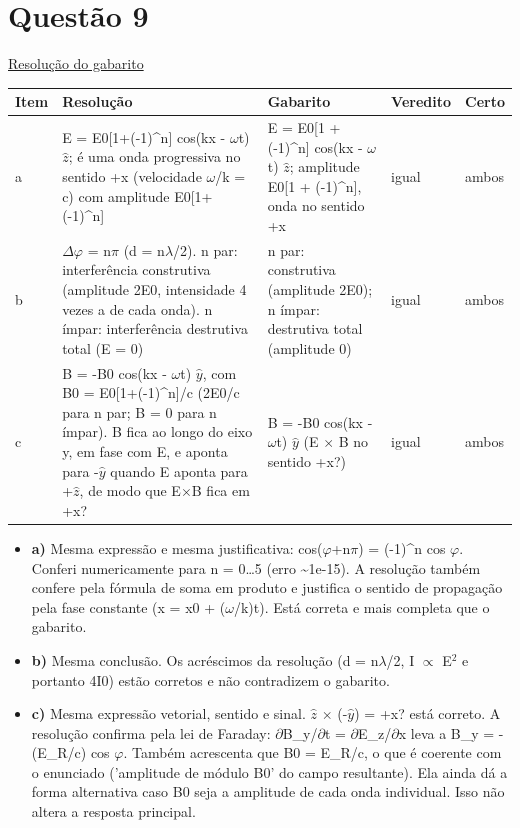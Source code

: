 \documentclass{article}%
\begin{document}
\section*{Questão 9}%
\href{https://poliedroresolve.sistemapoliedro.com.br/vestibulares/ita/2027/ita-2-fase-dia-3-22-10-2026-2-fase-dia-3/dissertativa-9-fisica-2-fase-dia-3-ita-2027}{Resolução do gabarito}\par\smallskip%
\begin{longtable}{@{}p{} p{} p{} p{} p{}@{}}\toprule Item & Resolução & Gabarito & Veredito & Certo \\ \midrule
a & E = E0{[}1+(-1)\^{}n{]} cos(kx - $\omega$t) $\hat z$; é uma onda progressiva no sentido +x (velocidade $\omega$/k = c) com amplitude E0{[}1+(-1)\^{}n{]} & E = E0{[}1 + (-1)\^{}n{]} cos(kx - $\omega$t) $\hat z$; amplitude E0{[}1 + (-1)\^{}n{]}, onda no sentido +x & igual & ambos \\
b & $\Delta$$\varphi$ = n$\pi$ (d = n$\lambda$/2). n par: interferência construtiva (amplitude 2E0, intensidade 4 vezes a de cada onda). n ímpar: interferência destrutiva total (E = 0) & n par: construtiva (amplitude 2E0); n ímpar: destrutiva total (amplitude 0) & igual & ambos \\
c & B = -B0 cos(kx - $\omega$t) $\hat y$, com B0 = E0{[}1+(-1)\^{}n{]}/c (2E0/c para n par; B = 0 para n ímpar). B fica ao longo do eixo y, em fase com E, e aponta para -$\hat y$ quando E aponta para +$\hat z$, de modo que E$\times$B fica em +x? & B = -B0 cos(kx - $\omega$t) $\hat y$ (E $\times$ B no sentido +x?) & igual & ambos \\
\bottomrule\end{longtable}%
\begin{itemize}%
\item%
\textbf{a)} Mesma expressão e mesma justificativa: cos($\varphi$+n$\pi$) = (-1)\^{}n cos $\varphi$. Conferi numericamente para n = 0\ldots{}5 (erro \textasciitilde{}1e{-}15). A resolução também confere pela fórmula de soma em produto e justifica o sentido de propagação pela fase constante (x = x0 + ($\omega$/k)t). Está correta e mais completa que o gabarito.%
\item%
\textbf{b)} Mesma conclusão. Os acréscimos da resolução (d = n$\lambda$/2, I $\propto$ E$^2$ e portanto 4I0) estão corretos e não contradizem o gabarito.%
\item%
\textbf{c)} Mesma expressão vetorial, sentido e sinal. $\hat z$ $\times$ (-$\hat y$) = +x? está correto. A resolução confirma pela lei de Faraday: $\partial$B\_y/$\partial$t = $\partial$E\_z/$\partial$x leva a B\_y = -(E\_R/c) cos $\varphi$. Também acrescenta que B0 = E\_R/c, o que é coerente com o enunciado ('amplitude de módulo B0' do campo resultante). Ela ainda dá a forma alternativa caso B0 seja a amplitude de cada onda individual. Isso não altera a resposta principal.%
\end{itemize}%
\end{document}
